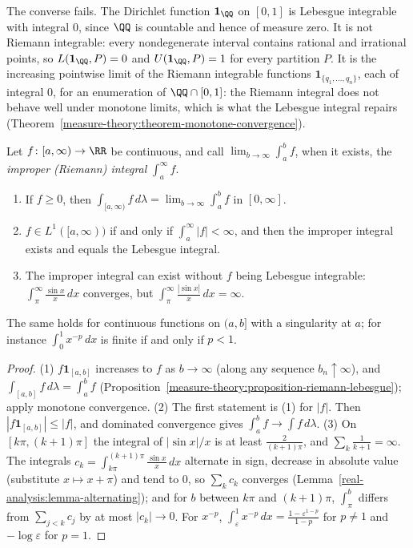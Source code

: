 \begin{counterexample}\label{measure-theory:counterexample-dirichlet}
The converse fails. The Dirichlet function $\mathbf{1}_\QQ$ on $[0, 1]$ is Lebesgue integrable with integral $0$, since $\QQ$ is countable and hence of measure zero. It is not Riemann integrable: every nondegenerate interval contains rational
and irrational points, so $L(\mathbf{1}_\QQ, P) = 0$ and $U(\mathbf{1}_\QQ, P) = 1$ for every partition $P$. It is the increasing pointwise limit of the Riemann integrable functions $\mathbf{1}_{\{q_1, \ldots, q_n\}}$, each of integral $0$, for an
enumeration of $\QQ \cap [0, 1]$: the Riemann integral does not behave well under monotone limits, which is what the Lebesgue integral repairs (Theorem~\ref{measure-theory:theorem-monotone-convergence}).
\end{counterexample}

\begin{proposition}\label{measure-theory:proposition-improper}
Let $f \colon [a, \infty) \to \RR$ be continuous, and call $\lim_{b \to \infty}\int_a^bf$, when it exists, the \emph{improper (Riemann) integral} $\int_a^\infty f$.
\begin{enumerate}
\item If $f \geq 0$, then $\int_{[a, \infty)}f\,d\lambda = \lim_{b \to \infty}\int_a^bf$ in $[0, \infty]$.
\item $f \in L^1([a, \infty))$ if and only if $\int_a^\infty|f| < \infty$, and then the improper integral exists and equals the Lebesgue integral.
\item The improper integral can exist without $f$ being Lebesgue integrable: $\int_\pi^\infty\frac{\sin x}{x}\,dx$ converges, but $\int_\pi^\infty\frac{|\sin x|}{x}\,dx = \infty$.
\end{enumerate}
The same holds for continuous functions on $(a, b]$ with a singularity at $a$; for instance $\int_0^1x^{-p}\,dx$ is finite if and only if $p < 1$.
\end{proposition}

\begin{proof}
(1) $f\mathbf{1}_{[a, b]}$ increases to $f$ as $b \to \infty$ (along any sequence $b_n \uparrow \infty$), and $\int_{[a, b]}f\,d\lambda = \int_a^bf$ (Proposition~\ref{measure-theory:proposition-riemann-lebesgue});
apply monotone convergence. (2) The first statement is (1) for $|f|$. Then $|f\mathbf{1}_{[a, b]}| \leq |f|$, and dominated convergence gives $\int_a^bf \to \int f\,d\lambda$. (3) On
$[k\pi, (k + 1)\pi]$ the integral of $|\sin x|/x$ is at least $\frac{2}{(k + 1)\pi}$, and $\sum_k\frac1{k + 1} = \infty$. The integrals $c_k = \int_{k\pi}^{(k+1)\pi}\frac{\sin x}{x}\,dx$ alternate in sign,
decrease in absolute value (substitute $x \mapsto x + \pi$) and tend to $0$, so $\sum_kc_k$ converges (Lemma~\ref{real-analysis:lemma-alternating}); and for $b$ between $k\pi$ and $(k + 1)\pi$,
$\int_\pi^b$ differs from $\sum_{j < k}c_j$ by at most $|c_k| \to 0$. For $x^{-p}$, $\int_\varepsilon^1x^{-p}\,dx = \frac{1 - \varepsilon^{1-p}}{1 - p}$ for $p \neq 1$ and $-\log\varepsilon$ for $p = 1$.
\end{proof}

